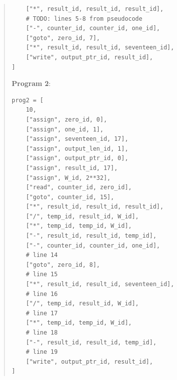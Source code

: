\documentclass[11pt]{article}
\begin{document}
\begin{enumerate}
\begin{enumerate}
\begin{quote}
\begin{verbatim}
    ["*", result_id, result_id, result_id],
    # TODO: lines 5-8 from pseudocode
    ["-", counter_id, counter_id, one_id],
    ["goto", zero_id, 7],
    ["*", result_id, result_id, seventeen_id],
    ["write", output_ptr_id, result_id],
] 
    \end{verbatim} 
    \vspace{1em}
    \textbf{Program 2}: \newline 
    \begin{verbatim}
prog2 = [
    10,
    ["assign", zero_id, 0],
    ["assign", one_id, 1],
    ["assign", seventeen_id, 17],
    ["assign", output_len_id, 1],
    ["assign", output_ptr_id, 0],
    ["assign", result_id, 17],
    ["assign", W_id, 2**32],
    ["read", counter_id, zero_id],
    ["goto", counter_id, 15],
    ["*", result_id, result_id, result_id],
    ["/", temp_id, result_id, W_id],
    ["*", temp_id, temp_id, W_id],
    ["-", result_id, result_id, temp_id],
    ["-", counter_id, counter_id, one_id],
    # line 14
    ["goto", zero_id, 8],
    # line 15
    ["*", result_id, result_id, seventeen_id],
    # line 16
    ["/", temp_id, result_id, W_id],
    # line 17
    ["*", temp_id, temp_id, W_id],
    # line 18
    ["-", result_id, result_id, temp_id],
    # line 19
    ["write", output_ptr_id, result_id],
]
    \end{verbatim}
    \vspace{1em}
    \end{quote} 
    

\end{enumerate}
\end{enumerate}
\end{document}
